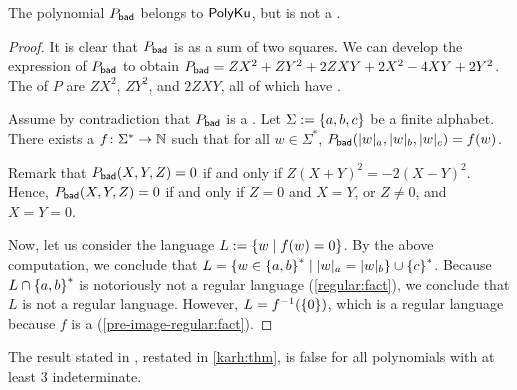 \begin{lemma}
    \label{thm:counter-example}
    The polynomial $P_{\mathsf{bad}}$ belongs to $\mathsf{PolyKu}$,
    but is not a .
\end{lemma}
\begin{proof}
    It is clear that $P_{\mathsf{bad}}$ is  as a sum of two 
    squares. We can develop
    the expression of $P_{\mathsf{bad}}$ to 
    obtain
    $P_{\mathsf{bad}} = ZX^2 + ZY^2 + 2ZXY + 2X^2 -4XY + 2Y^2$.
    The  of $P$
    are $ZX^2$, $ZY^2$, and $2ZXY$, all of which have
    .

    Assume by contradiction that $P_{\mathsf{bad}}$ is a .
    Let $\Sigma \mathrel{:=} \mathopen{\{} a,b,c \mathclose{\}}$ be a finite alphabet.
    There exists a 
     $f \colon \Sigma^* \to \mathbb{N}$
    such that for all $w \in \Sigma^*$,
    $\BadPoly(\card[a]{w}, \card[b]{w}, \card[c]{w}) = f(w)$.

    Remark that $P_{\mathsf{bad}}(X,Y,Z) = 0$
    if and only if $Z(X+Y)^2 = -2 (X-Y)^2$. Hence,
    $P_{\mathsf{bad}}(X,Y,Z)=0$ if and only if $Z = 0$ and $X = Y$, or 
    $Z \neq 0$, and $X = Y = 0$.

    Now, let us consider the language $L \mathrel{:=} \mathopen{\{} w \mid  f(w) = 0 \mathclose{\}}$. By the
    above computation, we conclude that $L = \setof{ w \in \set{a,b}^* }{
    \card[a]{w} = \card[b]{w} } \cup \set{ c }^*$.
    Because $L \cap \mathopen{\{} a,b \mathclose{\}}^*$ is notoriously not a regular language
    (\cref{regular:fact}), we
    conclude that $L$ is not a regular language.
    However, $L = f^{-1}(\mathopen{\{} 0 \mathclose{\}})$, which is a regular language
    because $f$ is a 
    (\cref{pre-image-regular:fact}).
\end{proof}

\begin{corollary}
    The result stated in \cite[Theorem 3.3]{KARH77}, restated
    in \cref{karh:thm}, is false
    for all polynomials with at least $3$ indeterminate.
\end{corollary}
